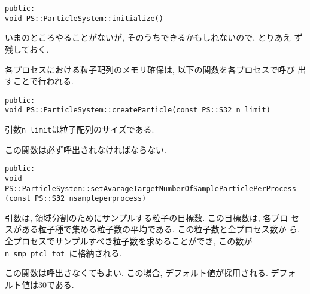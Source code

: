 
\begin{screen}
\begin{verbatim}
public:
void PS::ParticleSystem::initialize()
\end{verbatim}
\end{screen}

いまのところやることがないが, そのうちできるかもしれないので, とりあえ
ず残しておく.


各プロセスにおける粒子配列のメモリ確保は, 以下の関数を各プロセスで呼び
出すことで行われる.
\begin{screen}
\begin{verbatim}
public:
void PS::ParticleSystem::createParticle(const PS::S32 n_limit)
\end{verbatim}
\end{screen}

引数{\tt n\_limit}は粒子配列のサイズである. 

この関数は必ず呼出されなければならない.


\begin{screen}
\begin{verbatim}
public:
void PS::ParticleSystem::setAvarageTargetNumberOfSampleParticlePerProcess
(const PS::S32 nsampleperprocess)
\end{verbatim}
\end{screen}

引数は, 領域分割のためにサンプルする粒子の目標数. この目標数は, 各プロ
セスがある粒子種で集める粒子数の平均である. この粒子数と全プロセス数か
ら, 全プロセスでサンプルすべき粒子数を求めることができ, この数が{\tt
n\_smp\_ptcl\_tot\_}に格納される.

この関数は呼出さなくてもよい. この場合, デフォルト値が採用される. デフォ
ルト値は30である.


